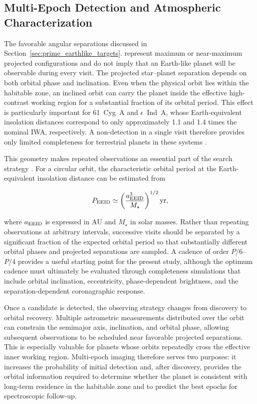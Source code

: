 \subsection{Multi-Epoch Detection and Atmospheric Characterization}
\label{sec:earthlike_multi_epoch}

The favorable angular separations discussed in Section~\ref{sec:prime_earthlike_targets}. represent maximum or near-maximum projected configurations and do not imply that an
Earth-like planet will be observable during every visit. The projected
star--planet separation depends on both orbital phase and inclination. Even
when the physical orbit lies within the habitable zone, an inclined orbit
can carry the planet inside the effective high-contrast working region for a
substantial fraction of its orbital period. This effect is particularly
important for 61~Cyg~A and $\epsilon$~Ind~A, whose Earth-equivalent
insolation distances correspond to only approximately 1.1 and 1.4 times the
nominal IWA, respectively. A non-detection in a single visit therefore
provides only limited completeness for terrestrial planets in these systems
\cite{brown05}.

This geometry makes repeated observations an essential part of the search
strategy \cite{brown05,brown10}. For a circular orbit, the characteristic 
orbital period at the Earth-equivalent insolation distance can be estimated from

\begin{equation}
P_{\rm EEID}
\simeq
\left(
\frac{a_{\rm EEID}^{3}}{M_\star}
\right)^{1/2}
{\rm yr},
\label{eq:eeid_period}
\end{equation}

where $a_{\rm EEID}$ is expressed in AU and $M_\star$ in solar masses.
Rather than repeating observations at arbitrary intervals, successive visits
should be separated by a significant fraction of the expected orbital
period so that substantially different orbital phases and projected
separations are sampled. 
A cadence of order $P/6$--$P/4$ provides a useful starting point
for the present study, although the optimum cadence must ultimately
be evaluated through completeness simulations that include orbital
inclination, eccentricity, phase-dependent brightness, and the
separation-dependent coronagraphic response.

Once a candidate is detected, the observing strategy changes from discovery
to orbital recovery. Multiple astrometric measurements distributed over the
orbit can constrain the semimajor axis, inclination, and orbital phase,
allowing subsequent observations to be scheduled near favorable projected
separations. This is especially valuable for planets whose orbits repeatedly
cross the effective inner working region. Multi-epoch imaging therefore
serves two purposes: it increases the probability of initial detection and,
after discovery, provides the orbital information required to determine
whether the planet is consistent with long-term residence in the habitable
zone and to predict the best epochs for spectroscopic follow-up.

